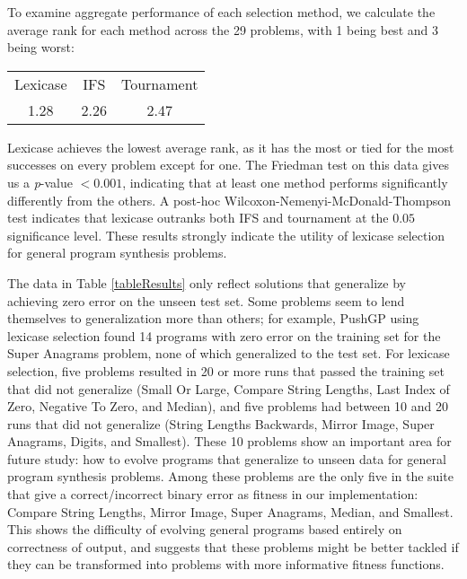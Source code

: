 \documentclass{sig-alternate}
\begin{document}
To examine aggregate performance of each selection method, we calculate the average rank for each method across the 29 problems, with 1 being best and 3 being worst:
\begin{center}
\begin{tabular}{ccc}
\toprule
Lexicase & IFS & Tournament \\
1.28 & 2.26 & 2.47 \\
\bottomrule
\end{tabular}
\end{center}
Lexicase achieves the lowest average rank, as it has the most or tied for the most successes on every problem except for one. The Friedman test on this data gives us a \textit{p}-value $< 0.001$, indicating that at least one method performs significantly differently from the others. A post-hoc Wilcoxon-Nemenyi-McDonald-Thompson test \cite{hollander1999nonparametric} indicates that lexicase outranks both IFS and tournament at the $0.05$ significance level. These results strongly indicate the utility of lexicase selection for general program synthesis problems.

The data in Table \ref{tableResults} only reflect solutions that generalize by achieving zero error on the unseen test set. Some problems seem to lend themselves to generalization more than others; for example, PushGP using lexicase selection found 14 programs with zero error on the training set for the Super Anagrams problem, none of which generalized to the test set. For lexicase selection, five problems resulted in 20 or more runs that passed the training set that did not generalize (Small Or Large,
Compare String Lengths,
Last Index of Zero,
Negative To Zero, and
Median),
and five problems had between 10 and 20 runs that did not generalize (String Lengths Backwards,
Mirror Image,
Super Anagrams,
Digits, and
Smallest).
These 10 problems show an important area for future study: how to evolve programs that generalize to unseen data for general program synthesis problems. Among these problems are the only five in the suite that give a correct/incorrect binary error as fitness in our implementation: Compare String Lengths, Mirror Image, Super Anagrams, Median, and Smallest. This shows the difficulty of evolving general programs based entirely on correctness of output, and suggests that these problems might be better tackled if they can be transformed into problems with more informative fitness functions.

%
\end{document}
